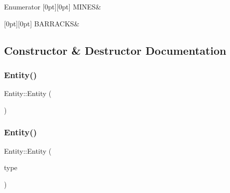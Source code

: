 \begin{DoxyEnumFields}{Enumerator}
[0pt][0pt]{}\mbox{\label{class_entity_afd4a8ca3ac152f193c21d6a5100f1192a7fb1e7b7efaa8f16d93200c255dff653}} 
M\+I\+N\+ES&\\
\hline

[0pt][0pt]{}\mbox{\label{class_entity_afd4a8ca3ac152f193c21d6a5100f1192a8cc861dde9f75c57766f2d2ab2541da4}} 
B\+A\+R\+R\+A\+C\+KS&\\
\hline

\end{DoxyEnumFields}


\subsection{Constructor \& Destructor Documentation}
\mbox{\label{class_entity_a980f368aa07ce358583982821533a54a}} 
\subsubsection{\texorpdfstring{Entity()}{Entity()}\hspace{0.1cm}{\footnotesize\ttfamily [1/2]}}
{\footnotesize\ttfamily Entity\+::\+Entity (\begin{DoxyParamCaption}{ }\end{DoxyParamCaption})}

\mbox{\label{class_entity_a87f2cfed74d4760a135942131d368dea}} 
\subsubsection{\texorpdfstring{Entity()}{Entity()}\hspace{0.1cm}{\footnotesize\ttfamily [2/2]}}
{\footnotesize\ttfamily Entity\+::\+Entity (\begin{DoxyParamCaption}\item[{\mbox{\hyperlink{class_entity_afd4a8ca3ac152f193c21d6a5100f1192}{entity\+Type}}}]{type }\end{DoxyParamCaption})}

